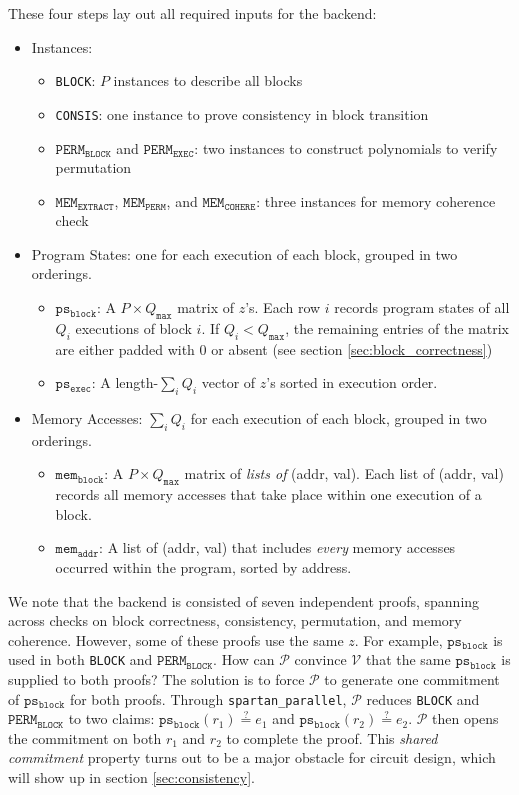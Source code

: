 \documentclass{article}
\newcommand{\code}{\texttt}
\newcommand{\Qmax}{Q_{\mathtt{max}}}
\renewcommand{\P}{\mathcal{P}}
\newcommand{\V}{\mathcal{V}}
\newcommand{\PERMB}{\mathtt{PERM_{BLOCK}}}
\newcommand{\PERME}{\mathtt{PERM_{EXEC}}}
\newcommand{\MEME}{\mathtt{MEM_{EXTRACT}}}
\newcommand{\MEMP}{\mathtt{MEM_{PERM}}}
\newcommand{\MEMC}{\mathtt{MEM_{COHERE}}}
\newcommand{\psb}{\mathtt{ps_{block}}}
\newcommand{\pse}{\mathtt{ps_{exec}}}
\newcommand{\memb}{\mathtt{mem_{block}}}
\newcommand{\mema}{\mathtt{mem_{addr}}}
\newcommand{\eqq}{\stackrel{?}{=}}
\begin{document}
\noindent These four steps lay out all required inputs for the backend:
\begin{itemize}
    \item Instances:
    \begin{itemize}
        \item \code{BLOCK}: $P$ instances to describe all blocks
        \item \code{CONSIS}: one instance to prove consistency in block transition
        \item $\PERMB$ and $\PERME$: two instances to construct polynomials to verify permutation
        \item $\MEME$, $\MEMP$, and $\MEMC$: three instances for memory coherence check
    \end{itemize}
    \item Program States: one for each execution of each block, grouped in two orderings.
    \begin{itemize}
        \item $\psb$: A $P\times \Qmax$ matrix of $z$'s. Each row $i$ records program states of all $Q_i$ executions of block $i$. If $Q_i < \Qmax$, the remaining entries of the matrix are either padded with 0 or absent (see section \ref{sec:block_correctness})
        \item $\pse$: A length-$\sum_i Q_i$ vector of $z$'s sorted in execution order.
    \end{itemize}
    \item Memory Accesses: $\sum_i Q_i$ for each execution of each block, grouped in two orderings.
    \begin{itemize}
        \item $\memb$: A $P\times \Qmax$ matrix of \emph{lists of} (addr, val). Each list of (addr, val) records all memory accesses that take place within one execution of a block.
        \item $\mema$: A list of (addr, val) that includes \emph{every} memory accesses occurred within the program, sorted by address.
    \end{itemize}
\end{itemize}

We note that the backend is consisted of seven independent proofs, spanning across checks on block correctness, consistency, permutation, and memory coherence. However, some of these proofs use the same $z$. For example, $\psb$ is used in both \code{BLOCK} and $\PERMB$. How can $\P$ convince $\V$ that the same $\psb$ is supplied to both proofs? The solution is to force $\P$ to generate one commitment of $\psb$ for both proofs. Through \code{spartan\_parallel}, $\P$ reduces \code{BLOCK} and $\PERMB$ to two claims: $\psb(r_1) \eqq e_1$ and $\psb(r_2) \eqq e_2$. $\P$ then opens the commitment on both $r_1$ and $r_2$ to complete the proof. This \emph{shared commitment} property turns out to be a major obstacle for circuit design, which will show up in section \ref{sec:consistency}.
\end{document}
